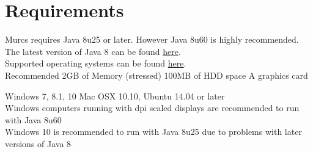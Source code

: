 \section{Requirements}

Murcs requires Java 8u25 or later. However Java 8u60 is highly recommended.\\
The latest version of Java 8 can be found  \href{http://www.oracle.com/technetwork/java/javase/downloads/index-jsp-138363.html}{here}.\\
Supported operating systems can be found
\href{http://www.oracle.com/technetwork/java/javase/certconfig-2095354.html}{here}.\\

Recommended
2GB of Memory (stressed)
100MB of HDD space
A graphics card

Windows 7, 8.1, 10 Mac OSX 10.10, Ubuntu 14.04 or later\\
Windows computers running with dpi scaled displays are recommended to run with Java 8u60\\
Windows 10 is recommended to run with Java 8u25 due to problems with later versions of Java 8
